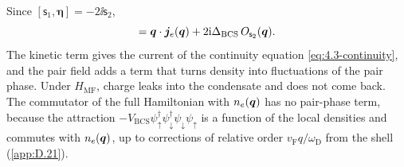 Since $[\mathsf{s}_1, \boldsymbol{\eta}] = -2\ii\mathsf{s}_2$,
\begin{equation}
  [H_{\mathrm{MF}}, n_e(\vect{q})] = \vect{q}\cdot\vect{j}_e(\vect{q}) + 2\ii\Delta_{\mathrm{BCS}}\,O_{\mathsf{s}_2}(\vect{q}) .
  \label{eq:7.2-comm}
\end{equation}
The kinetic term gives the current of the continuity equation \cref{eq:4.3-continuity}, and the pair field adds a term that turns density into fluctuations of the pair phase. Under $H_{\mathrm{MF}}$, charge leaks into the condensate and does not come back. The commutator of the full Hamiltonian with $n_e(\bm{q})$ has no pair-phase term, because the attraction $-V_{\mathrm{BCS}}\psi^\dagger_\uparrow\psi^\dagger_\downarrow\psi_\downarrow\psi_\uparrow$ is a function of the local densities and commutes with $n_e(\bm{q})$, up to corrections of relative order $v_{\mathrm{F}}q/\omega_{\mathrm{D}}$ from the shell (\cref{app:D.21}).

